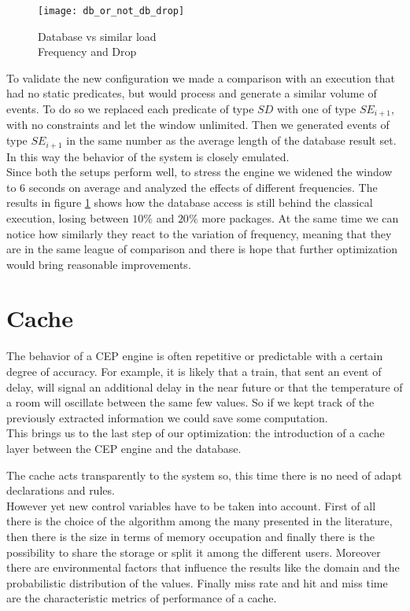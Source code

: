 \begin{figure}[h]
  \centering
  \texttt{[image: db\_or\_not\_db\_drop]}
  \caption{Database vs similar load\\
  	Frequency and Drop}
  \label{fig:db_or_not_db_drop}
\end{figure}

To validate the new configuration we made a comparison with an execution that had no static predicates, but would process and generate a similar volume of events. To do so we replaced each predicate of type $SD$ with one of type $SE_{i+1}$, with no constraints and let the window unlimited. Then we generated events of type $SE_{i+1}$ in the same number as the average length of the database result set. In this way the behavior of the system is closely emulated.\\
Since both the setups perform well, to stress the engine we widened the window to 6 seconds on average and analyzed the effects of different frequencies. The results in figure \ref{fig:db_or_not_db_drop} shows how the database access is still behind the classical execution, losing between $10\%$ and $20\%$ more packages. At the same time we can notice how similarly they react to the variation of frequency, meaning that they are in the same league of comparison and there is hope that further optimization would bring reasonable improvements. 

\section{Cache}
The behavior of a CEP engine is often repetitive or predictable with a certain degree of accuracy. For example, it is likely that a train, that sent an event of delay, will signal an additional delay in the near future or that the temperature of a room will oscillate between the same few values. So if we kept track of the previously extracted information we could save some computation.\\
This brings us to the last step of our optimization: the introduction of a cache layer between the CEP engine and the database.

The cache acts transparently to the system so, this time there is no need of adapt declarations and rules.\\
However yet new control variables have to be taken into account. First of all there is the choice of the algorithm among the many presented in the literature, then there is the size in terms of memory occupation and finally there is the possibility to share the storage or split it among the different users. Moreover there are environmental factors that influence the results like the domain and the probabilistic distribution of the values. Finally miss rate and hit and miss time are the characteristic metrics of performance of a cache.

